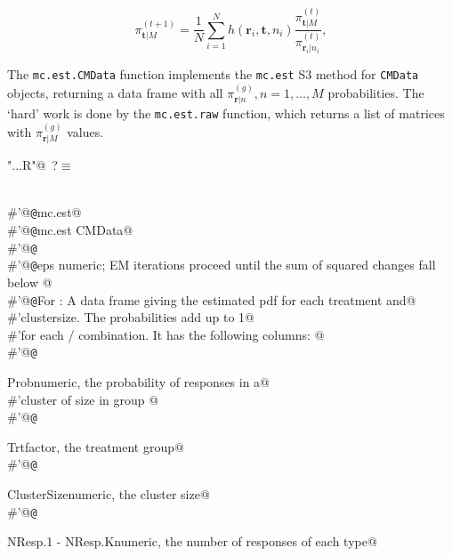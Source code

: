 \documentclass[reqno]{amsart}
\renewcommand{\NWtarget}[2]{\hypertarget{#1}{#2}}
\newcommand{\rvec}{\mathbf{r}}
\newcommand{\tvec}{\mathbf{t}}
\begin{document}
\begin{equation}\label{F:EMupdate0}
 \pi_{\tvec|M}^{(t+1)} = \frac{1}{N} \sum_{i=1}^{N} h(\rvec_{i},\tvec,n_{i})
             \frac{\pi^{(t)}_{\tvec|M}}{\pi^{(t)}_{\rvec_{i}|n_{i}}},
\end{equation}

The \texttt{mc.est.CMData} function implements the \texttt{mc.est} S3 method for \texttt{CMData} objects, 
returning a data frame with all  $\pi^{(g)}_{\rvec|n}, n=1,\ldots, M$ probabilities. The `hard' work is done
by the \texttt{mc.est.raw} function, which returns a list of matrices with  $\pi^{(g)}_{\rvec|M}$ values.
\begin{flushleft} \small\label{scrap19}\raggedright\small
\NWtarget{nuweb?}{} \verb@"..\R\ExchMultinomial.R"@\nobreak\ {\footnotesize {?}}$\equiv$
\vspace{-1ex}
\begin{list}{}{} \item
\mbox{}\verb@@\\
\mbox{}\verb@#'@{\tt @}\verb@rdname mc.est@\\
\mbox{}\verb@#'@{\tt @}\verb@method mc.est CMData@\\
\mbox{}\verb@#'@{\tt @}\verb@export@\\
\mbox{}\verb@#'@{\tt @}\verb@param eps numeric; EM iterations proceed until the sum of squared changes fall below   @\\
\mbox{}\verb@#'@{\tt @}\verb@return For : A data frame giving the estimated pdf for each treatment and@\\
\mbox{}\verb@#'clustersize.  The probabilities add up to 1@\\
\mbox{}\verb@#'for each / combination. It has the following columns: @\\
\mbox{}\verb@#'@{\tt @}\verb@return \item{Prob}{numeric, the probability of  responses in a@\\
\mbox{}\verb@#'cluster of size  in group }@\\
\mbox{}\verb@#'@{\tt @}\verb@return \item{Trt}{factor, the treatment group}@\\
\mbox{}\verb@#'@{\tt @}\verb@return \item{ClusterSize}{numeric, the cluster size}@\\
\mbox{}\verb@#'@{\tt @}\verb@return \item{NResp.1 - NResp.K}{numeric, the number of responses of each type}@\\

\end{list}
\end{flushleft}
\end{document}
